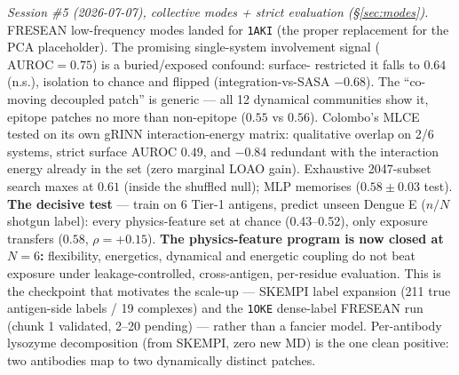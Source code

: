 \medskip
\emph{Session \#5 (2026-07-07), collective modes + strict evaluation (\S\ref{sec:modes}).} FRESEAN
low-frequency modes landed for \texttt{1AKI} (the proper replacement for the PCA placeholder). The
promising single-system involvement signal ($\mathrm{AUROC}=0.75$) is a buried/exposed confound: surface-
restricted it falls to $0.64$ (n.s.), isolation to chance and flipped (integration-vs-SASA $-0.68$). The
``co-moving decoupled patch'' is generic --- all 12 dynamical communities show it, epitope patches no more
than non-epitope ($0.55$ vs $0.56$). Colombo's MLCE tested on its own gRINN interaction-energy matrix:
qualitative overlap on 2/6 systems, strict surface AUROC $0.49$, and $-0.84$ redundant with the interaction
energy already in the set (zero marginal LOAO gain). Exhaustive 2047-subset search maxes at $0.61$ (inside
the shuffled null); MLP memorises ($0.58\pm0.03$ test). \textbf{The decisive test} --- train on 6 Tier-1
antigens, predict unseen Dengue E ($n/N$ shotgun label): every physics-feature set at chance (0.43--0.52),
only exposure transfers ($0.58$, $\rho=+0.15$). \textbf{The physics-feature program is now closed at $N=6$:}
flexibility, energetics, dynamical and energetic coupling do not beat exposure under leakage-controlled,
cross-antigen, per-residue evaluation. This is the checkpoint that motivates the scale-up --- SKEMPI label
expansion (211 true antigen-side labels / 19 complexes) and the \texttt{1OKE} dense-label FRESEAN run
(chunk 1 validated, 2--20 pending) --- rather than a fancier model. Per-antibody lysozyme decomposition
(from SKEMPI, zero new MD) is the one clean positive: two antibodies map to two dynamically distinct patches.
